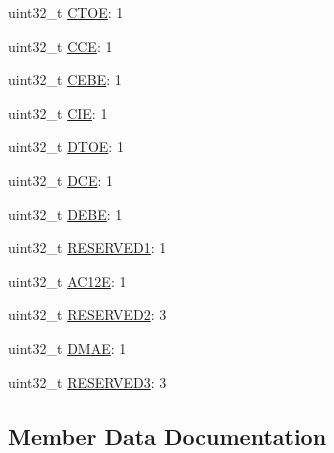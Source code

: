 \begin{DoxyCompactItemize}
\item 
uint32\+\_\+t \hyperlink{struct__hw__sdhc__irqstat_1_1__hw__sdhc__irqstat__bitfields_abc655aaa4df5afbe3ed71f0e88d20393}{C\+T\+OE}\+: 1
\item 
uint32\+\_\+t \hyperlink{struct__hw__sdhc__irqstat_1_1__hw__sdhc__irqstat__bitfields_a359aae15467f93c1db222a8b4e3c371a}{C\+CE}\+: 1
\item 
uint32\+\_\+t \hyperlink{struct__hw__sdhc__irqstat_1_1__hw__sdhc__irqstat__bitfields_aa2863b0957924d8e56002f3e7d39ef48}{C\+E\+BE}\+: 1
\item 
uint32\+\_\+t \hyperlink{struct__hw__sdhc__irqstat_1_1__hw__sdhc__irqstat__bitfields_a5f59a31fafcc7e1742c321788d1bef52}{C\+IE}\+: 1
\item 
uint32\+\_\+t \hyperlink{struct__hw__sdhc__irqstat_1_1__hw__sdhc__irqstat__bitfields_a701f1c2ac4bd7550ba915412b5454cad}{D\+T\+OE}\+: 1
\item 
uint32\+\_\+t \hyperlink{struct__hw__sdhc__irqstat_1_1__hw__sdhc__irqstat__bitfields_abf49bf02dc3c2013f8bafbeea3b77378}{D\+CE}\+: 1
\item 
uint32\+\_\+t \hyperlink{struct__hw__sdhc__irqstat_1_1__hw__sdhc__irqstat__bitfields_afb87848b12da14e2ff9dde111285d47a}{D\+E\+BE}\+: 1
\item 
uint32\+\_\+t \hyperlink{struct__hw__sdhc__irqstat_1_1__hw__sdhc__irqstat__bitfields_ad2d1eab7c2ff7a8b628b8b4f5aefd1bd}{R\+E\+S\+E\+R\+V\+E\+D1}\+: 1
\item 
uint32\+\_\+t \hyperlink{struct__hw__sdhc__irqstat_1_1__hw__sdhc__irqstat__bitfields_aa40ac975cbaa590845ffdf6b912aee8d}{A\+C12E}\+: 1
\item 
uint32\+\_\+t \hyperlink{struct__hw__sdhc__irqstat_1_1__hw__sdhc__irqstat__bitfields_aaade2c0c09ffd72509887cfcfe3203d9}{R\+E\+S\+E\+R\+V\+E\+D2}\+: 3
\item 
uint32\+\_\+t \hyperlink{struct__hw__sdhc__irqstat_1_1__hw__sdhc__irqstat__bitfields_a3a68fc9057b937b664a7ebe622d9c77a}{D\+M\+AE}\+: 1
\item 
uint32\+\_\+t \hyperlink{struct__hw__sdhc__irqstat_1_1__hw__sdhc__irqstat__bitfields_a49908c887f5fe440201633ba575dd279}{R\+E\+S\+E\+R\+V\+E\+D3}\+: 3
\end{DoxyCompactItemize}


\subsection{Member Data Documentation}
